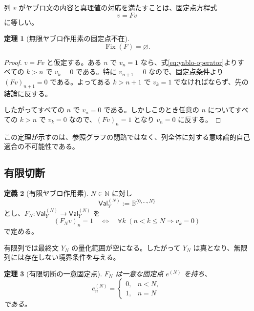 \documentclass[a4paper,11pt]{ltjsarticle}
\theoremstyle{definition}
\newtheorem{definition}{定義}[section]
\theoremstyle{plain}
\newtheorem{theorem}[definition]{定理}
\newcommand{\Val}{\mathsf{Val}}
\newcommand{\Fix}{\operatorname{Fix}}
\newcommand{\Bool}{\mathbb B}
\newcommand{\N}{\mathbb N}
\begin{document}
列 $v$ がヤブロ文の内容と真理値の対応を満たすことは、固定点方程式
\begin{equation}
 v=Fv
 \label{eq:global-fixed-point}
\end{equation}
に等しい。

\begin{theorem}[無限ヤブロ作用素の固定点不在]
\begin{equation}
 \Fix(F)=\varnothing.
 \label{eq:no-fixed-point}
\end{equation}
\end{theorem}

\begin{proof}
$v=Fv$ と仮定する。ある $n$ で $v_n=1$ なら、式\eqref{eq:yablo-operator}よりすべての $k>n$ で $v_k=0$ である。特に $v_{n+1}=0$ なので、固定点条件より $(Fv)_{n+1}=0$ である。よってある $k>n+1$ で $v_k=1$ でなければならず、先の結論に反する。

したがってすべての $n$ で $v_n=0$ である。しかしこのとき任意の $n$ についてすべての $k>n$ で $v_k=0$ なので、$(Fv)_n=1$ となり $v_n=0$ に反する。
\end{proof}

この定理が示すのは、参照グラフの閉路ではなく、列全体に対する意味論的自己適合の不可能性である。

\subsection{有限切断}

\begin{definition}[有限ヤブロ作用素]
$N\in\N$ に対し
\begin{equation}
 \Val_Y^{(N)}:=\Bool^{\{0,\dots,N\}}
\end{equation}
とし、$F_N:\Val_Y^{(N)}\to\Val_Y^{(N)}$ を
\begin{equation}
 (F_Nv)_n=1
 \quad\Longleftrightarrow\quad
 \forall k\;(n<k\leq N\Rightarrow v_k=0)
 \label{eq:finite-operator}
\end{equation}
で定める。
\end{definition}

有限列では最終文 $Y_N$ の量化範囲が空になる。したがって $Y_N$ は真となり、無限列には存在しない境界条件を与える。

\begin{theorem}[有限切断の一意固定点]
$F_N$ は一意な固定点 $e^{(N)}$ を持ち、
\begin{equation}
 e^{(N)}_n=
 \begin{cases}
  0,&n<N,\\
  1,&n=N
 \end{cases}
 \label{eq:finite-fixed-point}
\end{equation}
である。
\end{theorem}
\end{document}
